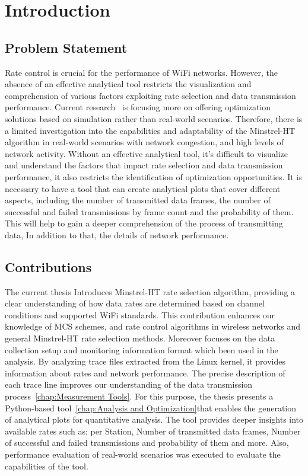 
\chapter{Introduction}
\label{chap:introduction}

\section{Problem Statement}
\label{sec:introduction:probstatement}


Rate control is crucial for the performance of WiFi networks.
However, the absence of an effective analytical tool restricts the visualization and comprehension of various factors exploiting rate selection and data transmission performance. Current research~\cite{8548800} is focusing more on offering optimization solutions based on simulation rather than real-world scenarios. Therefore, there is a limited investigation into the capabilities and adaptability of the Minstrel-HT algorithm in real-world scenarios with network congestion, and high levels of network activity. Without an effective analytical tool, it's difficult to visualize and understand the factors that impact rate selection and data transmission performance, it also restricts the identification of optimization opportunities. 
It is necessary to have a tool that can create analytical plots that cover different aspects, including the number of transmitted data frames, the number of successful and failed transmissions by frame count and the probability of them. This will help to gain a deeper comprehension of the process of transmitting data, In addition to that, the details of network performance.




\section{Contributions}
\label{sec:introduction:contrib}

The current thesis Introduces Minstrel-HT rate selection algorithm, providing a clear understanding of how data rates are determined based on channel conditions and supported WiFi standards. This contribution enhances our knowledge of MCS schemes, and rate control algorithms in wireless networks and general Minstrel-HT rate selection methods. Moreover focuses on the data collection setup and monitoring information format which been used in the analysis. By analyzing trace files extracted from the Linux kernel, it provides information about rates and network performance. The precise description of each trace line improves our understanding of the data transmission process~\ref{chap:Measurement Tools}.
For this purpose, the thesis presents a Python-based tool~\ref{chap:Analysis and Optimization}that enables the generation of analytical plots for quantitative analysis. The tool provides deeper insights into available rates such as; per Station, Number of transmitted data frames, Number of successful and failed transmissions and probability of them and more. Also, performance evaluation of real-world scenarios was executed to evaluate the capabilities of the tool.

